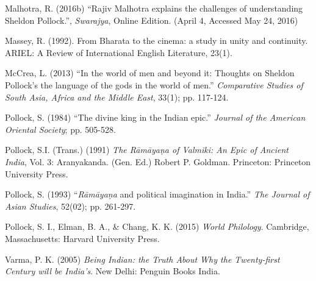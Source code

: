 \begin{thebibliography}{99}
  Malhotra, R. (2016b) “Rajiv Malhotra explains the challenges of understanding Sheldon Pollock.”, \textit{Swarajya}, Online Edition. (April 4, Accessed May 24, 2016)

  Massey, R. (1992). From Bharata to the cinema: a study in unity and continuity. ARIEL: A Review of International English Literature, 23(1).

  McCrea, L. (2013) “In the world of men and beyond it: Thoughts on Sheldon Pollock’s the language of the gods in the world of men.” \textit{Comparative Studies of South Asia, Africa and the Middle East}, 33(1); pp. 117-124.

  Pollock, S. (1984) “The divine king in the Indian epic.” \textit{Journal of the American Oriental Society}; pp. 505-528.

  Pollock, S.I. (Trans.) (1991) \textit{The Rāmāyaṇa of Valmiki: An Epic of Ancient India}, Vol. 3: Aranyakanda. (Gen. Ed.) Robert P. Goldman. Princeton: Princeton University Press.

  Pollock, S. (1993) “\textit{Rāmāyaṇa} and political imagination in India.” \textit{The Journal of Asian Studies}, 52(02); pp. 261-297.

  Pollock, S. I., Elman, B. A., \& Chang, K. K. (2015) \textit{World Philology}. Cambridge, Massachusetts: Harvard University Press.

  Varma, P. K. (2005) \textit{Being Indian: the Truth About Why the Twenty-first Century will be India's}. New Delhi: Penguin Books India.

 \end{thebibliography}

\theendnotes

